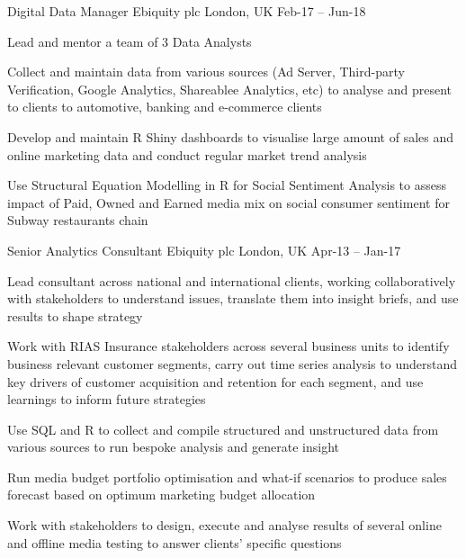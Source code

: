 \begin{cventries}
  \cventry
    {Digital Data Manager} %
    {Ebiquity plc} %
    {London, UK} %
    {Feb-17 – Jun-18} %
    {
      \begin{cvitems} %
        \item {Lead and mentor a team of 3 Data Analysts}
        \item {Collect and maintain data from various sources (Ad Server, Third-party Verification, Google Analytics, Shareablee Analytics, etc) to analyse and present to clients to automotive, banking and e-commerce clients}
        \item {Develop and maintain R Shiny dashboards to visualise large amount of sales and online marketing data and conduct regular market trend analysis}
        \item {Use Structural Equation Modelling in R for Social Sentiment Analysis to assess impact of Paid, Owned and Earned media mix on social consumer sentiment for Subway restaurants chain}
      \end{cvitems}
    }

  \cventry
    {Senior Analytics Consultant} %
    {Ebiquity plc} %
    {London, UK} %
    {Apr-13 – Jan-17} %
    {
      \begin{cvitems} %
        \item {Lead consultant across national and international clients, working collaboratively with stakeholders to understand issues, translate them into insight briefs, and use results to shape strategy}
        \item {Work with RIAS Insurance stakeholders across several business units to identify business relevant customer segments, carry out time series analysis to understand key drivers of customer acquisition and retention for each segment, and use learnings to inform future strategies}
        \item {Use SQL and R to collect and compile structured and unstructured data from various sources to run bespoke analysis and generate insight}
        \item {Run media budget portfolio optimisation and what-if scenarios to produce sales forecast based on optimum marketing budget allocation}
        \item {Work with stakeholders to design, execute and analyse results of several online and offline media testing to answer clients’ specific questions}
      \end{cvitems}
    }


\end{cventries}
